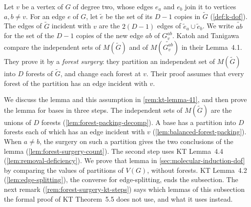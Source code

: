 Let $v$ be a vertex of $G$ of degree two, whose edges $e_a$ and $e_b$
join it to vertices $a, b \neq v$. For an edge $e$ of $G$, let
$\tilde e$ be the set of its $D - 1$ copies in $\tilde G$
(\cref{def:k-dof}). The edges of $\tilde G$ incident with $v$ are the
$2(D - 1)$ edges of $\tilde e_a \cup \tilde e_b$. We write
$\widetilde{ab}$ for the set of the $D - 1$ copies of the new edge $ab$
of $G_v^{ab}$. Katoh and Tanigawa~\cite[p.~660]{katohTanigawa2011}
compare the independent sets of $M(\tilde G)$ and of
$M(\widetilde{G_v^{ab}})$ in their Lemma~4.1. They prove it by a
\emph{forest surgery}: they partition an independent set of
$M(\tilde G)$ into $D$ forests of $\tilde G$, and change each forest at
$v$. Their proof assumes that every forest of the partition has an edge
incident with $v$.

We discuss the lemma and this assumption in \cref{rem:kt-lemma-41}, and
then prove the lemma for bases in three steps. The independent sets of
$M(\tilde G)$ are the unions of $D$ forests
(\cref{lem:forest-packing-decomp}). A base has a partition into $D$
forests each of which has an edge incident with $v$
(\cref{lem:balanced-forest-packing}). When $a \neq b$, the surgery on
such a partition gives the two conclusions of the lemma
(\cref{lem:forest-surgery-count}). The second step uses KT Lemma~4.4
(\cref{lem:removal-deficiency}). We prove that lemma in
\cref{sec:molecular-induction-dof} by comparing the values of partitions
of $V(G)$, without forests. KT Lemma~4.2 (\cref{lem:edge-splitting}),
the converse for edge-splitting, ends the subsection. The next remark
(\cref{rem:forest-surgery-kt-steps}) says which lemmas of this
subsection the formal proof of KT Theorem~5.5 does not use, and what it
uses instead.

